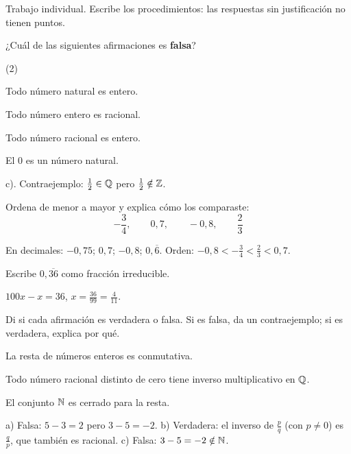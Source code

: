 \documentclass[11pt]{article}
\begin{document}
\encabezado

\begin{instrucciones}
Trabajo individual. Escribe los procedimientos: las respuestas sin justificación no tienen
puntos.
\end{instrucciones}

\begin{preguntas}

\pregunta[1] ¿Cuál de las siguientes afirmaciones es \textbf{falsa}?
\begin{opciones*}(2)
  \item Todo número natural es entero.
  \item Todo número entero es racional.
  \item Todo número racional es entero.
  \item El $0$ es un número natural.
\end{opciones*}
\begin{solucion}
c). Contraejemplo: $\frac{1}{2} \in \mathbb{Q}$ pero $\frac{1}{2} \notin \mathbb{Z}$.
\end{solucion}

\pregunta[1.5] Ordena de menor a mayor y explica cómo los comparaste:
\[
  -\frac{3}{4}, \qquad 0{,}7, \qquad -0{,}8, \qquad \frac{2}{3}
\]
\begin{solucion}[3cm]
En decimales: $-0{,}75$; $0{,}7$; $-0{,}8$; $0{,}\overline{6}$. Orden:
$-0{,}8 < -\frac{3}{4} < \frac{2}{3} < 0{,}7$.
\end{solucion}

\pregunta[1] Escribe $0{,}\overline{36}$ como fracción irreducible.
\begin{solucion}[2.5cm]
$100x - x = 36$, $x = \frac{36}{99} = \frac{4}{11}$.
\end{solucion}

\pregunta[1.5] Di si cada afirmación es verdadera o falsa. Si es falsa, da un contraejemplo;
si es verdadera, explica por qué.
\begin{opciones}
  \item La resta de números enteros es conmutativa.
  \item Todo número racional distinto de cero tiene inverso multiplicativo en $\mathbb{Q}$.
  \item El conjunto $\mathbb{N}$ es cerrado para la resta.
\end{opciones}
\begin{solucion}[2.5cm]
a) Falsa: $5 - 3 = 2$ pero $3 - 5 = -2$. b) Verdadera: el inverso de $\frac{p}{q}$ (con
$p \neq 0$) es $\frac{q}{p}$, que también es racional. c) Falsa: $3 - 5 = -2 \notin \mathbb{N}$.
\end{solucion}

\end{preguntas}
\end{document}

